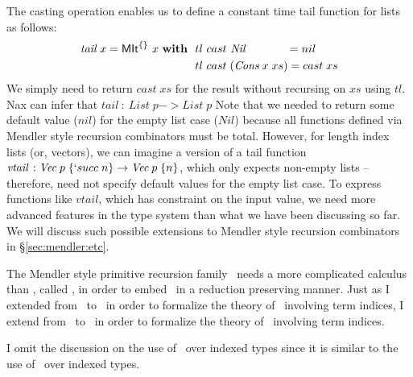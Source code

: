 The casting operation enables us to define a constant time tail function for
lists as follows:
\begin{align*}
\textit{tail}~x = \textsf{MIt}^{\{\}}~x~\textbf{with}~~
&  tl ~cast~\textit{Nil}~~~~~~~~~~~ = nil \\
&  tl ~cast\;(\textit{Cons}\;x\;xs) = cast\;xs
\end{align*}
We simply need to return $cast\;xs$ for the result
without recursing on $xs$ using $tl$. Nax can infer that
$\textit{tail} ~:~ \textit{List}\;p -> \textit{List}\;p$
Note that we needed to return some default value ($nil$) for the empty list case
($Nil$) because all functions defined via Mendler style recursion combinators
must be total. However, for length index lists (or, vectors), we can imagine
a version of a tail function
$\textit{vtail}\,:\textit{Vec}\;p\;\{`succ\;n\} -> \textit{Vec}\;p\;\{n\}$,
which only expects non-empty lists -- therefore, need not specify default
values for the empty list case. To express functions like $vtail$, which has
constraint on the input value, we need more advanced features in the type system
than what we have been discussing so far. We will discuss such possible
extensions to Mendler style recursion combinators in \S\ref{sec:mendler:etc}.

The Mendler style primitive recursion family \MPr\ needs a more complicated
calculus than \Fi, called \Fixw, in order to embed \MPr\ in a reduction
preserving manner. Just as I extended from \Fw\ to \Fi\ in order to
formalize the theory of \MIt\ involving term indices, I extend from \Fixw\
to \Fixi\ in order to formalize the theory of \MPr\ involving term indices.

I omit the discussion on the use of \MPr\ over indexed types
since it is similar to the use of \MIt\ over indexed types.

